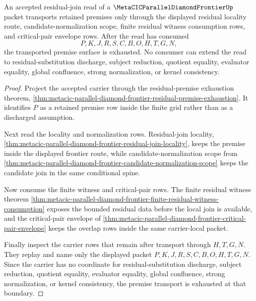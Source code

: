 \begin{theorem}
\label{thm:metacic-parallel-diamond-frontier-residual-premise-transport-exhaustion}
An accepted residual-join read of a $\MetaCICParallelDiamondFrontierUp$
packet transports retained premises only through the displayed residual
locality route, candidate-normalization scope, finite residual witness
consumption rows, and critical-pair envelope rows. After the read has consumed
$$
P,K,J,R,S,C,B,O,H,T,G,N ,
$$
the transported premise surface is exhausted. No consumer can extend the read
to residual-substitution discharge, subject reduction, quotient equality,
evaluator equality, global confluence, strong normalization, or kernel
consistency.
\end{theorem}
\begin{proof}
Project the accepted carrier through the residual-premise exhaustion theorem,
\autoref{thm:metacic-parallel-diamond-frontier-residual-premise-exhaustion}.
It identifies $P$ as a retained premise row inside the finite grid rather than
as a discharged assumption.

Next read the locality and normalization rows. Residual-join locality,
\autoref{thm:metacic-parallel-diamond-frontier-residual-join-locality}, keeps
the premise inside the displayed frontier route, while candidate-normalization
scope from \autoref{thm:metacic-parallel-diamond-frontier-candidate-normalization-scope}
keeps the candidate join in the same conditional spine.

Now consume the finite witness and critical-pair rows. The finite residual
witness theorem \autoref{thm:metacic-parallel-diamond-frontier-finite-residual-witness-consumption}
exposes the bounded residual data before the local join is available, and the
critical-pair envelope of \autoref{thm:metacic-parallel-diamond-frontier-critical-pair-envelope}
keeps the overlap rows inside the same carrier-local packet.

Finally inspect the carrier rows that remain after transport through $H,T,G,N$.
They replay and name only the displayed packet
$P,K,J,R,S,C,B,O,H,T,G,N$. Since the carrier has no coordinate for
residual-substitution discharge, subject reduction, quotient equality,
evaluator equality, global confluence, strong normalization, or kernel
consistency, the premise transport is exhausted at that boundary.
\end{proof}

